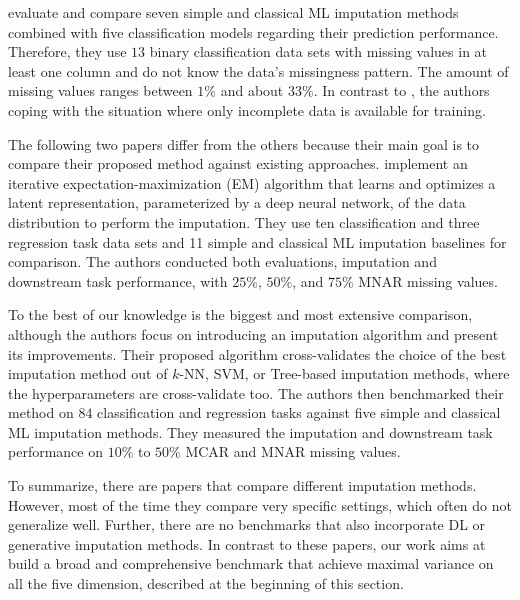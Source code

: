 \cite{Imputation_Benchmark_1} evaluate and compare seven simple and classical ML imputation methods combined with five classification models regarding their prediction performance. Therefore,  they use $13$ binary classification data sets with missing values in at least one column and do not know the data's missingness pattern. The amount of missing values ranges between $1\%$ and about $33\%$. In contrast to \citep{Imputation_Benchmark_3, Imputation_Benchmark_2}, the authors coping with the situation where only incomplete data is available for training.

The following two papers differ from the others because their main goal is to compare their proposed method against existing approaches. \cite{Imputation_Benchmark_6} implement an iterative expectation-maximization (EM) algorithm that learns and optimizes a latent representation, parameterized by a deep neural network, of the data distribution to perform the imputation. They use ten classification and three regression task data sets and 11 simple and classical ML imputation baselines for comparison. The authors conducted both evaluations, imputation and downstream task performance, with $25\%$, $50\%$, and $75\%$ MNAR missing values.

To the best of our knowledge \citep{Imputation_Benchmark_4} is the biggest and most extensive comparison, although the authors focus on introducing an imputation algorithm and present its improvements. Their proposed algorithm cross-validates the choice of the best imputation method out of $k$-NN, SVM, or Tree-based imputation methods, where the hyperparameters are cross-validate too. The authors then benchmarked their method on $84$ classification and regression tasks against five simple and classical ML imputation methods. They measured the imputation and downstream task performance on $10\%$ to $50\%$ MCAR and MNAR missing values.

To summarize, there are papers that compare different imputation methods. However, most of the time they compare very specific settings, which often do not generalize well. Further, there are no benchmarks that also incorporate DL or generative imputation methods. In contrast to these papers, our work aims at build a broad and comprehensive benchmark that achieve maximal variance on all the five dimension, described at the beginning of this section.

